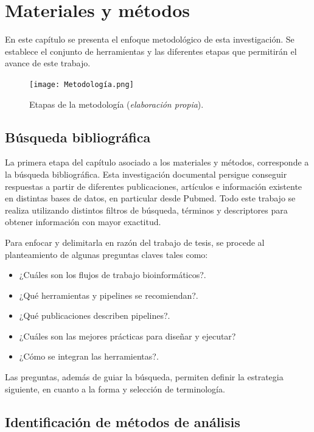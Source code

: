 \documentclass[12pt]{article}
\begin{document}
\newpage
\section{Materiales y métodos}

En este capítulo se presenta  el enfoque metodológico de esta 
investigación. Se establece el conjunto de herramientas y 
las diferentes etapas que permitirán el avance de este trabajo.

\begin{figure}[ht!]
    \centering
    \small
    \texttt{[image: Metodología.png]}
    \caption{Etapas de la metodología (\emph{elaboración propia}).}
    \label{fig:distribucion}
\end{figure}

\subsection*{Búsqueda bibliográfica}

La primera etapa del capítulo asociado a los materiales 
y métodos, corresponde a la búsqueda bibliográfica. Esta  
investigación documental persigue conseguir respuestas a 
partir de diferentes publicaciones, artículos  e información 
existente en distintas  bases de datos, en particular  
desde Pubmed. Todo este trabajo se realiza utilizando distintos
filtros de búsqueda,  términos y descriptores para obtener 
información con mayor exactitud.

Para enfocar y delimitarla en razón del trabajo de tesis, se 
procede al planteamiento  de algunas preguntas claves tales como:

\begin{itemize}
    \item ¿Cuáles son los flujos de trabajo bioinformáticos?.
    \item ¿Qué herramientas y pipelines se recomiendan?.
    \item ¿Qué publicaciones describen pipelines?.
    \item ¿Cuáles son las mejores prácticas para diseñar y ejecutar?
    \item ¿Cómo se integran las herramientas?.
\end{itemize}

Las preguntas, además de guiar la búsqueda, permiten definir 
la estrategia siguiente, en cuanto a la forma y  selección de 
terminología.

\subsection*{Identificación de métodos de análisis}
\end{document}
